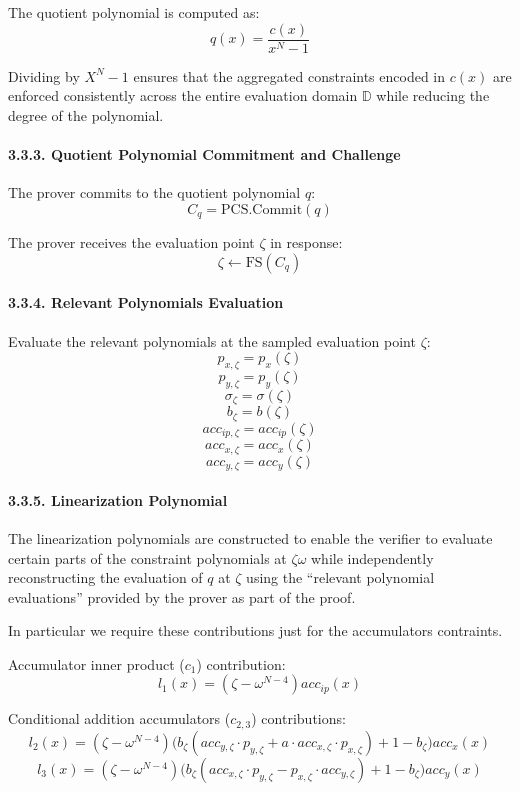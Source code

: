 \documentclass[
]{article}
\begin{document}
The quotient polynomial is computed as: \[q(x) = \frac{c(x)}{x^N - 1}\]

Dividing by \(X^N - 1\) ensures that the aggregated constraints encoded
in \(c(x)\) are enforced consistently across the entire evaluation
domain \(\mathbb{D}\) while reducing the degree of the polynomial.

\paragraph{3.3.3. Quotient Polynomial Commitment and
Challenge}\label{quotient-polynomial-commitment-and-challenge}

The prover commits to the quotient polynomial \(q\):
\[C_q = \text{PCS.Commit}(q)\]

The prover receives the evaluation point \(\zeta\) in response:
\[\zeta \leftarrow \text{FS}(C_q)\]

\paragraph{3.3.4. Relevant Polynomials
Evaluation}\label{relevant-polynomials-evaluation}

Evaluate the relevant polynomials at the sampled evaluation point
\(\zeta\): \[p_{x,\zeta} = p_x(\zeta)\] \[p_{y,\zeta} = p_y(\zeta)\]
\[\sigma_\zeta = \sigma(\zeta)\] \[b_\zeta = b(\zeta)\]
\[acc_{ip,\zeta} = acc_{ip}(\zeta)\] \[acc_{x,\zeta} = acc_x(\zeta)\]
\[acc_{y,\zeta} = acc_y(\zeta)\]

\paragraph{3.3.5. Linearization
Polynomial}\label{linearization-polynomial}

The linearization polynomials are constructed to enable the verifier to
evaluate certain parts of the constraint polynomials at \(\zeta \omega\)
while independently reconstructing the evaluation of \(q\) at \(\zeta\)
using the ``relevant polynomial evaluations'' provided by the prover as
part of the proof.

In particular we require these contributions just for the accumulators
contraints.

Accumulator inner product (\(c_1\)) contribution:
\[l_1(x)=(\zeta - \omega^{N-4})acc_{ip}(x)\]

Conditional addition accumulators (\(c_{2,3}\)) contributions:
\[l_2(x)=(\zeta-\omega^{N-4})\bigl(b_\zeta(acc_{y,\zeta} \cdot p_{y,\zeta}+a \cdot acc_{x,\zeta} \cdot p_{x,\zeta})+1-b_\zeta\bigr)acc_x(x)\]
\[l_3(x)=(\zeta-\omega^{N-4})\bigl(b_\zeta(acc_{x,\zeta} \cdot p_{y,\zeta}-p_{x,\zeta} \cdot acc_{y,\zeta})+1-b_\zeta\bigr)acc_y(x)\]
\end{document}
